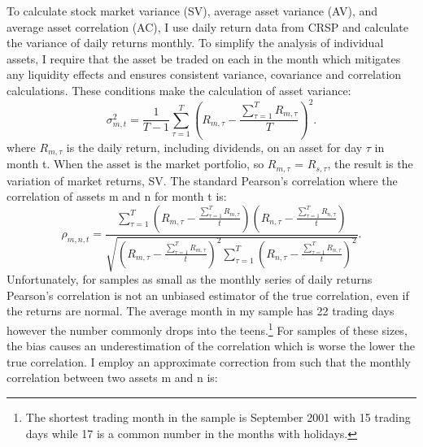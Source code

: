 To calculate stock market variance (SV), average asset variance (AV), and average asset correlation (AC), I use daily return data from CRSP and calculate the variance of daily returns monthly. To simplify the analysis of individual assets, I require that the asset be traded on each in the month which mitigates any liquidity effects and ensures consistent variance, covariance and correlation calculations. These conditions make the calculation of asset variance:
\begin{equation}
	\sigma^{2}_{m,t} = \frac{1}{T-1}\sum_{\tau = 1}^{T} \left(R_{m,\tau} - \frac{\sum_{\tau = 1}^{T} R_{m,\tau}}{T}\right)^{2}.
\end{equation}
where $R_{m,\tau}$ is the daily return, including dividends, on an asset for day $\tau$ in month t. When the asset is the market portfolio, so $R_{m,\tau}$ = $R_{s,\tau}$, the result is the variation of market returns, SV. The standard Pearson’s correlation where the correlation of assets m and n for month t is:
\begin{equation}
	\rho_{m,n,t} = \frac{\sum^{T}_{\tau = 1}\left(R_{m,\tau} - \frac{\sum_{\tau = 1}^{T} R_{m,\tau}}{t}\right)\left(R_{n,\tau} - \frac{\sum_{\tau = 1}^{T} R_{n,\tau}}{t}\right)}{\sqrt{\left(R_{m,\tau} - \frac{\sum_{\tau = 1}^{T} R_{m,\tau}}{t}\right)^{2}\sum_{\tau=1}^{T}\left(R_{n,\tau} - \frac{\sum_{\tau = 1}^{T} R_{n,\tau}}{t}\right)^{2} }}.
\end{equation}
Unfortunately, for samples as small as the monthly series of daily returns Pearson’s correlation is not an unbiased estimator of the true correlation, even if the returns are normal. \cite{hotelling_1953} The average month in my sample has 22 trading days however the number commonly drops into the teens.\footnote{The shortest trading month in the sample is September 2001 with 15 trading days while 17 is a common number in the months with holidays.} For samples of these sizes, the bias causes an underestimation of the correlation which is worse the lower the true correlation. I employ an approximate correction from \cite{olkin_1958} such that the monthly correlation between two assets m and n is:
